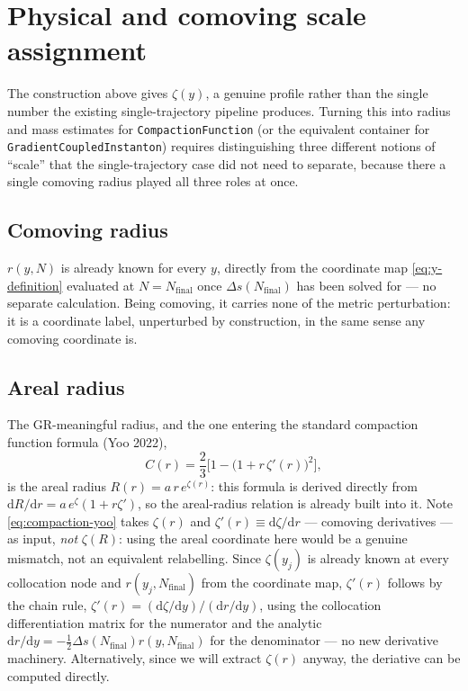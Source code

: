 \documentclass[a4paper,11pt]{article}
\renewcommand{\d}{\mathrm{d}}
\newcommand{\Ny}{N}                          %
\newcommand{\Nfinal}{N_{\mathrm{final}}}     %
\newcommand{\rad}{r}                         %
\newcommand{\yco}{y}                         %
\newcommand{\Deltas}{\Delta s}                %
\newcommand{\zprofile}{\zeta}                %
\begin{document}
\section{Physical and comoving scale assignment}
\label{sec:scale-assignment}

The construction above gives $\zprofile(\yco)$, a genuine profile rather
than the single number the existing single-trajectory pipeline produces.
Turning this into radius and mass estimates for
\texttt{CompactionFunction} (or the equivalent
container for \texttt{GradientCoupledInstanton})
requires distinguishing three different
notions of ``scale'' that the single-trajectory case did not need to
separate, because there a single comoving radius played all three roles
at once.

\subsection{Comoving radius}

$\rad(\yco,\Ny)$ is already known for every $\yco$, directly from the
coordinate map \eqref{eq:y-definition} evaluated at $\Ny=\Nfinal$ once
$\Deltas(\Nfinal)$ has been solved for --- no separate calculation. Being
comoving, it carries none of the metric perturbation: it is a coordinate
label, unperturbed by construction, in the same sense any comoving
coordinate is.

\subsection{Areal radius}

The GR-meaningful radius, and the one entering the standard compaction
function formula (Yoo 2022),
\begin{equation}
    C(\rad) = \frac23\Big[1-\big(1+\rad\,\zprofile'(\rad)\big)^2\Big] ,
    \label{eq:compaction-yoo}
\end{equation}
is the areal radius $R(\rad) = a\,\rad\,e^{\zprofile(\rad)}$: this formula
is derived directly from $\d R/\d\rad = a\,e^{\zprofile}(1+\rad\zprofile')$,
so the areal-radius relation is already built into it. Note
\eqref{eq:compaction-yoo} takes $\zprofile(\rad)$ and
$\zprofile'(\rad)\equiv\d\zprofile/\d\rad$ --- comoving derivatives --- as
input, \emph{not} $\zprofile(R)$: using the areal coordinate here would be
a genuine mismatch, not an equivalent relabelling. Since
$\zprofile(\yco_j)$ is already known at every collocation node and
$\rad(\yco_j,\Nfinal)$ from the coordinate map, $\zprofile'(\rad)$ follows
by the chain rule, $\zprofile'(\rad) = (\d\zprofile/\d\yco)/(\d\rad/\d\yco)$,
using the collocation differentiation matrix for the numerator and the
analytic $\d\rad/\d\yco=-\tfrac12\Deltas(\Nfinal)\rad(\yco,\Nfinal)$ for the
denominator --- no new derivative machinery.
Alternatively, since we will extract $\zeta(r)$ anyway, the
deriative can be computed directly.
\end{document}
